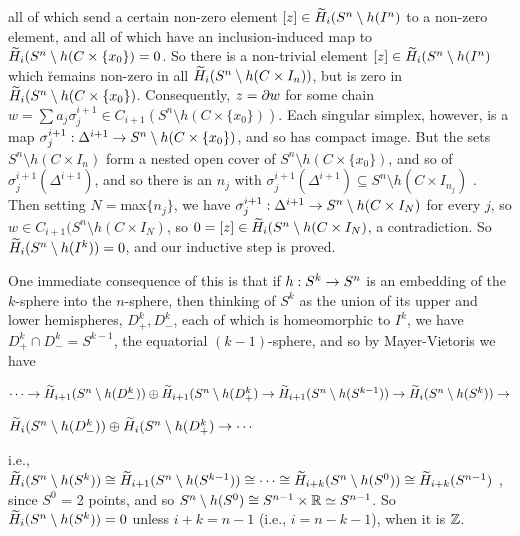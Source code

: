 
all of which send a certain non-zero element $[z]\in\widetilde{H}_i(S^n\setminus h(I^n)$ to 
a non-zero element, and all of which have an inclusion-induced map to $\widetilde{H}_i(S^n\setminus h(C\times \{x_0\}) = 0$.
So there is a non-trivial element $[z]\in \widetilde{H}_i(S^n\setminus h(I^n)$ which \u{remains}
non-zero in all $\widetilde{H}_i(S^n\setminus h(C\times I_n))$, but is zero in $\widetilde{H}_i(S^n\setminus h(C\times \{x_0\})$.
Consequently, $z=\partial w$ for some chain $w=\sum a_j\sigma_j^{i+1}\in C_{i+1}(S^n\setminus h(C\times \{x_0\}))$.
Each singular simplex, however, is a map $\sigma_j^{i+1}:\Delta^{i+1}\rightarrow S^n\setminus h(C\times \{x_0\})$,
and so has compact image. But the sets $S^n\setminus h(C\times I_n)$ form a nested open cover of
$S^n\setminus h(C\times \{x_0\})$, and so of $\sigma_j^{i+1}(\Delta^{i+1})$, and so there is an
$n_j$ with $\sigma_j^{i+1}(\Delta^{i+1})\subseteq S^n\setminus h(C\times I_{n_j})$ .
Then setting $N=$max$\{n_j\}$, we have $\sigma_j^{i+1}:\Delta^{i+1}\rightarrow S^n\setminus h(C\times I_N)$
for every $j$,
so $w\in C_{i+1}(S^n\setminus h(C\times I_N)$, so $0=[z]\in \widetilde{H}_i(S^n\setminus h(C\times I_N)$,
a contradiction. So $\widetilde{H}_i(S^n\setminus h(I^k))=0$, and our inductive step is proved.

\vfill
\eject

One immediate consequence of this is that if $h:S^k\rightarrow S^n$ is an embedding of the $k$-sphere into the $n$-sphere,
then thinking of $S^k$ as the union of its upper and lower hemispheres, $D^k_+,D^k_-$, each of which is homeomorphic
to $I^k$, we have  $D^k_+\cap D^k_-=S^{k-1}$, the equatorial $(k-1)$-sphere, and so by Mayer-Vietoris we have

\ssk

$\cdots \rightarrow 
\widetilde{H}_{i+1}(S^n\setminus h(D^k_-))\oplus \widetilde{H}_{i+1}(S^n\setminus h(D^k_+)\rightarrow
\widetilde{H}_{i+1}(S^n\setminus h(S^{k-1}))\rightarrow \widetilde{H}_{i}(S^n\setminus h(S^k))\rightarrow$

\hfill $\widetilde{H}_{i}(S^n\setminus h(D^k_-))\oplus \widetilde{H}_{i}(S^n\setminus h(D^k_+)\rightarrow \cdots $

i.e., $\widetilde{H}_{i}(S^n\setminus h(S^k)) \cong \widetilde{H}_{i+1}(S^n\setminus h(S^{k-1})) 
\cong \cdots \cong \widetilde{H}_{i+k}(S^n\setminus h(S^0))\cong \widetilde{H}_{i+k}(S^{n-1})$ ,
since $S^0$ = 2 points, and  so $S^n\setminus h(S^0)\cong S^{n-1}\times {\Bbb R} \simeq S^{n-1}$.
So $\widetilde{H}_{i}(S^n\setminus h(S^k)) = 0$ unless $i+k=n-1$ (i.e., $i=n-k-1$), when it is ${\Bbb Z}$.

